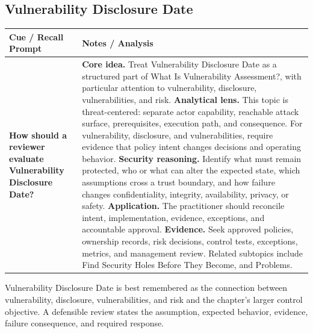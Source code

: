 \documentclass[11pt]{article}
\newcommand{\CornellHeader}{%
\rowcolor{Navy}\color{white}\bfseries Cue / Recall Prompt & \color{white}\bfseries Notes / Analysis\\\hline}
\newcommand{\CornellRow}[2]{%
\cellcolor{CueGray}\RaggedRight\textbf{#1} & \RaggedRight #2\\\hline}
\begin{document}
\subsection*{Vulnerability Disclosure Date}
\begin{longtable}{>{\RaggedRight\arraybackslash}p{}|>{\RaggedRight\arraybackslash}p{}}
\CornellHeader
\CornellRow{How should a reviewer evaluate Vulnerability Disclosure Date?}{\textbf{Core idea.} Treat Vulnerability Disclosure Date as a structured part of What Is Vulnerability Assessment?, with particular attention to vulnerability, disclosure, vulnerabilities, and risk. \textbf{Analytical lens.} This topic is threat-centered: separate actor capability, reachable attack surface, prerequisites, execution path, and consequence. For vulnerability, disclosure, and vulnerabilities, require evidence that policy intent changes decisions and operating behavior. \textbf{Security reasoning.} Identify what must remain protected, who or what can alter the expected state, which assumptions cross a trust boundary, and how failure changes confidentiality, integrity, availability, privacy, or safety. \textbf{Application.} The practitioner should reconcile intent, implementation, evidence, exceptions, and accountable approval. \textbf{Evidence.} Seek approved policies, ownership records, risk decisions, control tests, exceptions, metrics, and management review. Related subtopics include Find Security Holes Before They Become, and Problems.}
\end{longtable}
\begin{topicsummary}
Vulnerability Disclosure Date is best remembered as the connection between vulnerability, disclosure, vulnerabilities, and risk and the chapter's larger control objective. A defensible review states the assumption, expected behavior, evidence, failure consequence, and required response.
\end{topicsummary}
\end{document}
